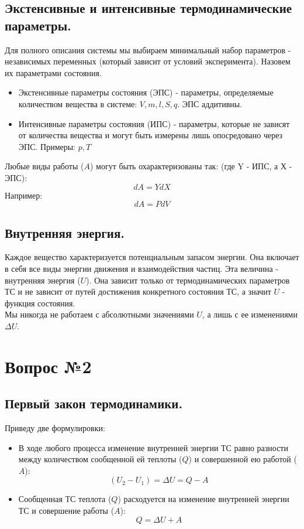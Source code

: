 \documentclass[14pt,a4paper]{scrartcl}
\begin{document}
	\subsection*{Экстенсивные и интенсивные термодинамические параметры.} 
	Для полного описания системы мы выбираем минимальный набор параметров - независимых переменных (который зависит от условий эксперимента). Назовем их параметрами состояния.
	\begin{itemize}
		\item Экстенсивные параметры состояния (ЭПС) - параметры, определяемые количеством вещества в системе: $ V, m, l, S, q  $. ЭПС аддитивны.
		\item Интенсивные параметры состояния (ИПС) - параметры, которые не зависят от количества вещества и могут быть измерены лишь опосредовано через ЭПС. Примеры: $p, T $
	\end{itemize}
	Любые виды работы ($A$) могут быть охарактеризованы так: (где Y - ИПС, а Х - ЭПС):
	$$ dA = Y dX  $$ 
	Например:
	$$ dA = P dV  $$
	\subsection*{Внутренняя энергия.} 
	Каждое вещество характеризуется потенциальным запасом энергии. Она включает в себя все виды энергии движения и взаимодействия частиц. Эта величина - внутренняя энергия ($U$). Она зависит только от термодинамических параметров ТС и не зависит от путей достижения конкретного состояния ТС, а значит $U$ - функция состояния. \\
	Мы никогда не работаем с абсолютными значениями $U$, а лишь с ее изменениями $\Delta{U}$.
		


	\section*{Вопрос №2}
	\subsection*{Первый закон термодинамики.} 
	Приведу две формулировки:
	\begin{itemize}
		\item В ходе любого процесса изменение внутренней энергии ТС равно разности между количеством сообщенной ей теплоты ($Q$) и совершенной ею работой ($A$):
		$$ (U_2 - U_1) = \Delta{U} = Q - A $$
		\item Сообщенная ТС теплота ($Q$) расходуется на изменение внутренней энергии ТС и совершение работы ($A$):
		$$ Q = \Delta{U} + A $$
	\end{itemize}
\end{document}
